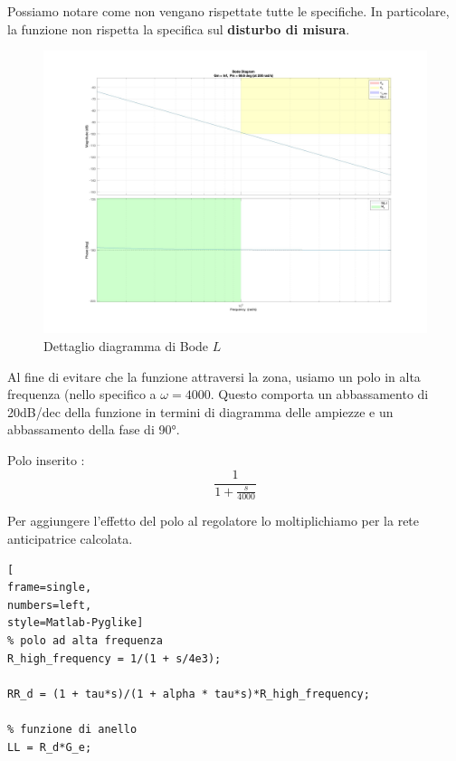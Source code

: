 \documentclass[a4paper, 11pt]{article}
\begin{document}
Possiamo notare come non vengano rispettate tutte le specifiche. In particolare, la funzione non rispetta la specifica sul \textbf{disturbo di misura}.

\vspace{0.4cm}

\begin{figure} [!h]
    \centering
    \includegraphics[scale = 0.15]{Immagini/LL_dettaglio.jpg}
    \caption{Dettaglio diagramma di Bode $L$}
    \label{fig:enter-label}
\end{figure}

\vspace{5cm}

Al fine di evitare che la funzione attraversi la zona, usiamo un polo in alta frequenza (nello specifico a $\omega = 4000$. Questo comporta un abbassamento di 20dB/dec della funzione in termini di diagramma delle ampiezze e un abbassamento della fase di 90°.

Polo inserito : $$\frac{1}{1 + \frac{s}{4000}}$$

Per aggiungere l'effetto del polo al regolatore lo moltiplichiamo per la rete anticipatrice calcolata.

\vspace{1.5cm}

\begin{lstlisting}[
frame=single,
numbers=left,
style=Matlab-Pyglike]
% polo ad alta frequenza
R_high_frequency = 1/(1 + s/4e3);

RR_d = (1 + tau*s)/(1 + alpha * tau*s)*R_high_frequency;

% funzione di anello
LL = R_d*G_e; 
\end{lstlisting}
\end{document}
